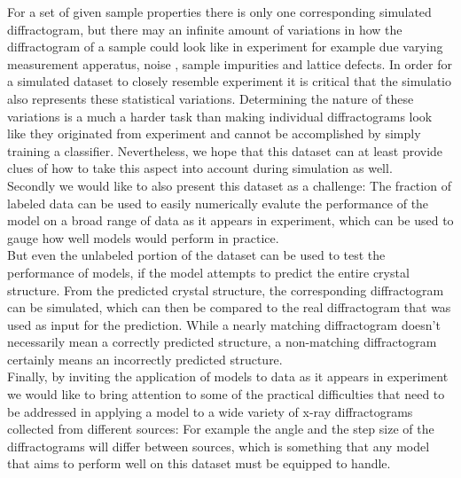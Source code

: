 For a set of given sample properties there is only one corresponding simulated diffractogram, but there may an infinite amount of variations in how the diffractogram of a sample could look like in experiment for example due varying measurement apperatus, noise
, sample impurities and lattice defects.
In order for a simulated dataset to closely resemble experiment it is critical that the simulatio also represents these
statistical variations.
Determining the nature of these variations is a much a harder task than making individual diffractograms look like they
originated from experiment and cannot be accomplished by simply training a classifier.
Nevertheless, we hope that this dataset can at least provide clues of how to take this aspect into account during
simulation as well.\\

Secondly we would like to also present this dataset as a challenge: The fraction of labeled data can be used to easily numerically evalute the performance of the model on a broad range of data as it appears in experiment, which can be used to gauge how well models would perform in practice. \\
But even the unlabeled portion of the dataset can be used to test the performance of models, if the model attempts to predict the entire crystal structure. From the predicted crystal structure, the corresponding diffractogram can be simulated, which can then be compared to the real diffractogram that was used as input for the prediction. While a nearly matching diffractogram doesn't necessarily mean a correctly predicted structure, a non-matching diffractogram certainly means an incorrectly predicted structure. \\


Finally, by inviting the application of models to data as it appears in experiment we would like to bring attention
to some of the practical difficulties that need to be addressed in applying a model to a wide variety of x-ray diffractograms
collected from different sources: For example the angle and the step size of the diffractograms will differ between sources, 
which is something that any model that aims to perform well on this dataset must be equipped to handle.



